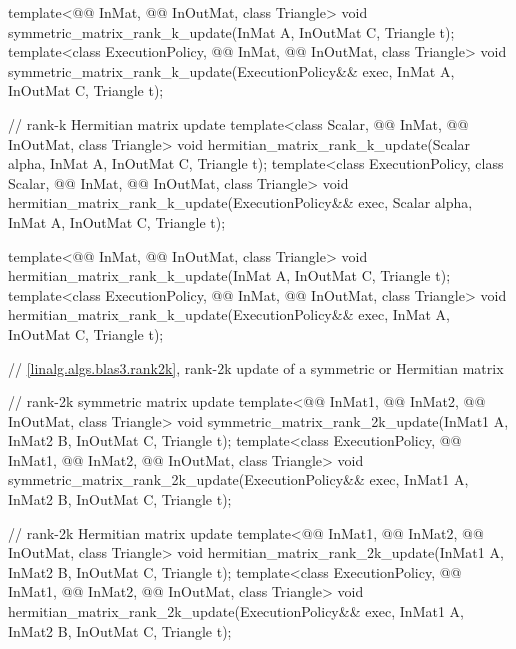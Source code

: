 \begin{codeblock}
{  template<@@ InMat, @@ InOutMat, class Triangle>
    void symmetric_matrix_rank_k_update(InMat A, InOutMat C, Triangle t);
  template<class ExecutionPolicy,
           @@ InMat, @@ InOutMat, class Triangle>
    void symmetric_matrix_rank_k_update(ExecutionPolicy&& exec,
                                        InMat A, InOutMat C, Triangle t);

  // rank-k Hermitian matrix update
  template<class Scalar, @@ InMat, @@ InOutMat, class Triangle>
    void hermitian_matrix_rank_k_update(Scalar alpha, InMat A, InOutMat C, Triangle t);
  template<class ExecutionPolicy,
           class Scalar, @@ InMat, @@ InOutMat, class Triangle>
    void hermitian_matrix_rank_k_update(ExecutionPolicy&& exec,
                                        Scalar alpha, InMat A, InOutMat C, Triangle t);

  template<@@ InMat, @@ InOutMat, class Triangle>
    void hermitian_matrix_rank_k_update(InMat A, InOutMat C, Triangle t);
  template<class ExecutionPolicy,
           @@ InMat, @@ InOutMat, class Triangle>
    void hermitian_matrix_rank_k_update(ExecutionPolicy&& exec,
                                        InMat A, InOutMat C, Triangle t);

  // \ref{linalg.algs.blas3.rank2k}, rank-2k update of a symmetric or Hermitian matrix

  // rank-2k symmetric matrix update
  template<@@ InMat1, @@ InMat2,
           @@ InOutMat, class Triangle>
    void symmetric_matrix_rank_2k_update(InMat1 A, InMat2 B, InOutMat C, Triangle t);
  template<class ExecutionPolicy,
           @@ InMat1, @@ InMat2,
           @@ InOutMat, class Triangle>
    void symmetric_matrix_rank_2k_update(ExecutionPolicy&& exec,
                                         InMat1 A, InMat2 B, InOutMat C, Triangle t);

  // rank-2k Hermitian matrix update
  template<@@ InMat1, @@ InMat2,
           @@ InOutMat, class Triangle>
    void hermitian_matrix_rank_2k_update(InMat1 A, InMat2 B, InOutMat C, Triangle t);
  template<class ExecutionPolicy,
           @@ InMat1, @@ InMat2,
           @@ InOutMat, class Triangle>
    void hermitian_matrix_rank_2k_update(ExecutionPolicy&& exec,
                                         InMat1 A, InMat2 B, InOutMat C, Triangle t);

}
\end{codeblock}
